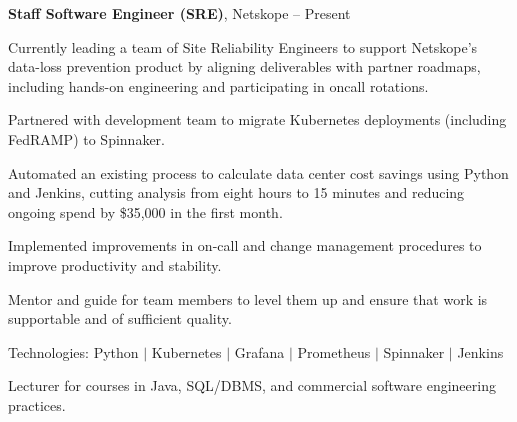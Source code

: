 \documentclass[MMMMyyyy,nonstopmode]{simpleresumecv_stacked}
\newcommand{\tech}[1]{\Gap\textrm{Technologies:} #1}
\newif\ifLOCATION
\begin{document}
\begin{Body}
\Entry
\textbf{Staff Software Engineer (SRE)}, Netskope
\hfill
 -- Present

\Gap
\begin{Detail}

Currently leading a team of Site Reliability Engineers to support Netskope's data-loss prevention product by aligning deliverables with partner roadmaps, including hands-on engineering and participating in oncall rotations.

\Gap

\BulletItem
Partnered with development team to migrate Kubernetes deployments (including FedRAMP) to Spinnaker.


\BulletItem
Automated an existing process to calculate data center cost savings using Python and Jenkins, 
cutting analysis from eight hours to 15 minutes and reducing ongoing spend by \$35,000 in the first month.


\BulletItem
Implemented improvements in on-call and change management procedures to improve productivity and stability.

\BulletItem
Mentor and guide for team members to level them up and ensure that work is supportable and of sufficient quality.


\end{Detail}

\tech{Python $|$ Kubernetes $|$ Grafana $|$ Prometheus $|$ Spinnaker $|$ Jenkins}

\BigGap

\iffalse %
\Entry
\textbf{Adjunct Professor}, Rochester Institute of Technology \textit{(Part-Time)}
\hfill
\DatestampY{2017} --
Present

\ifLOCATION
\hfill 
Rochester, New York
\fi

\Gap
\begin{Detail}
Lecturer for courses in Java, SQL/DBMS, and commercial software engineering practices.
\end{Detail}

\BigGap
\fi


\end{Body}
\end{document}
